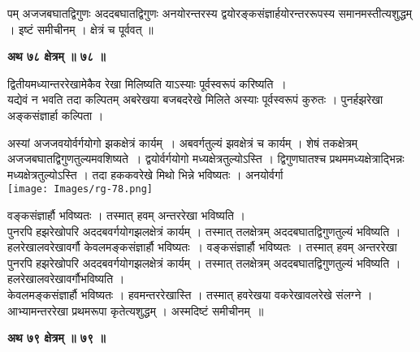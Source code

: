 \documentclass[11pt, openany]{book}
\makeatletter
\newcommand{\devanagarinumeral}[1]{%
	\devanagaridigits{\number \csname c@#1\endcsname}} %
\makeatother
\begin{document}
\afterpage{\fancyhead[LE,RO]{\thepage}}
\cfoot{}
\newpage
\newpage
\renewcommand{\thepage}{\devanagarinumeral{page}}
\setcounter{page}{109}
\noindent पम् अजजबघातद्विगुणः अददबघातद्विगुणः अनयोरन्तरस्य द्वयोरङ्कसंज्ञार्हयोरन्तररूपस्य समानमस्तीत्यशुद्धम् । इष्टं समीचीनम् । क्षेत्रं च पूर्ववत् ॥ \\
\begin{center}
\textbf{\large अथ ७८ क्षेत्रम् ॥ ७८ ॥ }
\end{center}
\vspace{2mm}

{\ab द्वितीयमध्यान्तररेखामेकैव रेखा मिलिष्यति याऽस्याः
पूर्वस्वरूपं करिष्यति~। }\\

 यद्येवं न भवति तदा कल्पितम् अबरेखया बजबदरेखे मिलिते
अस्याः पूर्वस्वरूपं कुरुतः । पुनर्हझरेखा अङ्कसंज्ञार्हा कल्पिता ।
\begin{vwcol}[widths={0.65,0.35}, sep=.8cm, rule=0pt]
 अस्यां अजजवयोर्वर्गयोगो झकक्षेत्रं कार्यम्~। अबवर्गतुल्यं झवक्षेत्रं च
कार्यम् । शेषं तकक्षेत्रम् अजजबघातद्विगुणतुल्यमवशिष्यते~। द्वयोर्वर्गयोगो मध्यक्षेत्रतुल्योऽस्ति । द्विगुणघातश्च प्रथममध्यक्षेत्राद्भिन्नः मध्यक्षेत्रतुल्योऽस्ति । तदा हककवरेखे मिथो
भिन्ने भविष्यतः । अनयोर्वर्गा\\
\noindent \texttt{[image: Images/rg-78.png]}
\end{vwcol}
\vspace{-3mm}

\noindent वङ्कसंज्ञार्हौ भविष्यतः । तस्मात्
हवम् अन्तररेखा भविष्यति । \\

पुनरपि हझरेखोपरि अददबवर्गयोगझलक्षेत्रं कार्यम् । तस्मात्
तलक्षेत्रम् अददबघातद्विगुणतुल्यं भविष्यति ।
हलरेखालवरेखावर्गौ केवलमङ्कसंज्ञार्हौ भविष्यतः~। 
वङ्कसंज्ञार्हौ भविष्यतः । तस्मात् हवम् अन्तररेखा 
पुनरपि हझरेखोपरि अददबवर्गयोगझलक्षेत्रं कार्यम् । तस्मात्
तलक्षेत्रम् अददबघातद्विगुणतुल्यं भविष्यति ।
हलरेखालवरेखावर्गौभविष्यति । \\

केवलमङ्कसंज्ञार्हौ भविष्यतः । हवमन्तररेखास्ति । तस्मात् हवरेखया
वकरेखावलरेखे संलग्ने । आभ्यामन्तररेखा प्रथमरूपा कृतेत्यशुद्धम् ।
अस्मदिष्टं समीचीनम्~॥\\
\begin{center}
\textbf{\large अथ ७९ क्षेत्रम् ॥ ७९ ॥}
\end{center}
\vspace{2mm}
\end{document}
